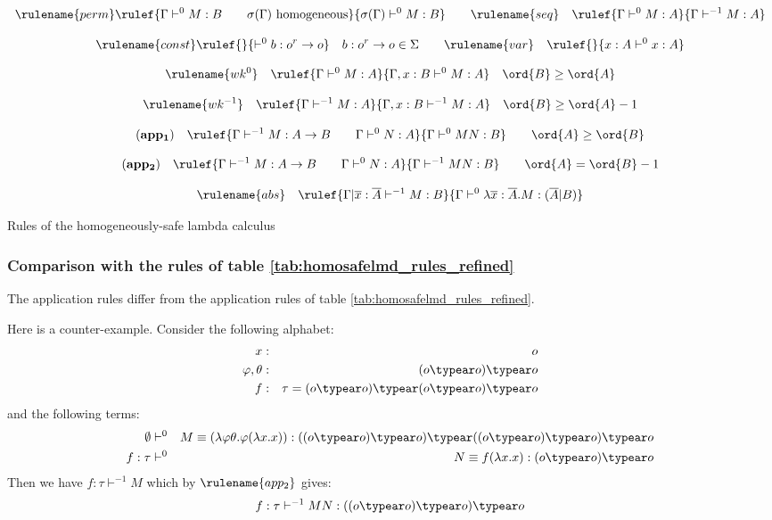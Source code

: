 \begin{table}[htbp]
$$  \rulename{perm}
    \rulef
      { \Gamma \vdash^0 M:B \qquad \sigma(\Gamma)  \hbox{ homogeneous} }
      { \sigma(\Gamma) \vdash^0 M : B }
\qquad \rulename{seq} \quad \rulef{\Gamma \vdash^{0} M : A}{\Gamma
\vdash^{-1} M : A}
$$

$$
 \rulename{const}
    \rulef{} {\vdash^0 b : o^r \rightarrow o} \quad b : o^r \rightarrow o \in \Sigma
\qquad
 \rulename{var} \quad  \rulef{}{x : A\vdash^{0} x : A} $$

$$ \rulename{wk^{0}} \quad  \rulef{\Gamma \vdash^{0} M : A}{\Gamma , x : B \vdash^{0} M : A} \quad \ord{B} \geq \ord{A} $$

$$ \rulename{wk^{-1}} \quad  \rulef{\Gamma \vdash^{-1} M : A}{\Gamma , x : B \vdash^{-1} M : A} \quad \ord{B} \geq \ord{A} -1$$


$$ \mathbf{(app_1)} \quad  \rulef{\Gamma \vdash^{-1} M : A\rightarrow B
                                        \qquad \Gamma \vdash^{0} N : A }
                                   {\Gamma  \vdash^{0} M N : B}
                                    \qquad \ord{A} \geq \ord{B}$$

$$ \mathbf{(app_2)} \quad  \rulef{\Gamma \vdash^{-1} M : A\rightarrow B
                                        \qquad \Gamma \vdash^{0} N : A
                                   }
                                   {\Gamma  \vdash^{-1} M N : B}
                                    \qquad \ord{A} = \ord{B} - 1$$

$$ \rulename{abs} \quad  \rulef{\Gamma| \overline{x} : \overline{A} \vdash^{-1} M : B}
                                   {\Gamma  \vdash^{0} \lambda \overline{x} : \overline{A} . M : (\overline{A}|B)}$$
\caption{Rules of the homogeneously-safe lambda calculus}
\label{va_tab:homosafelmd_rules}
\end{table}

\subsubsection{Comparison with the rules of table \ref{tab:homosafelmd_rules_refined}}

The application rules differ from the application rules of table \ref{tab:homosafelmd_rules_refined}.

Here is a counter-example. Consider the following alphabet:
\begin{eqnarray*}
 x&:&o\\
 \varphi, \theta &:& (o \typear o) \typear o \\
 f &:& \tau = (o \typear o) \typear (o \typear o) \typear o
\end{eqnarray*}
and the following terms:
\begin{eqnarray*}
\emptyset &\vdash^0& M \equiv (\lambda \varphi \theta . \varphi (\lambda x . x)) : ((o \typear o) \typear o) \typear ((o \typear o) \typear o) \typear o \\
f:\tau &\vdash^0& N \equiv f (\lambda x . x) : (o \typear o) \typear o
\end{eqnarray*}
Then we have $ f:\tau \vdash^{-1} M $ which by
$\rulename{app_2}$ gives:
$$ f : \tau \vdash^{-1} M N : ((o \typear o) \typear o) \typear o$$

